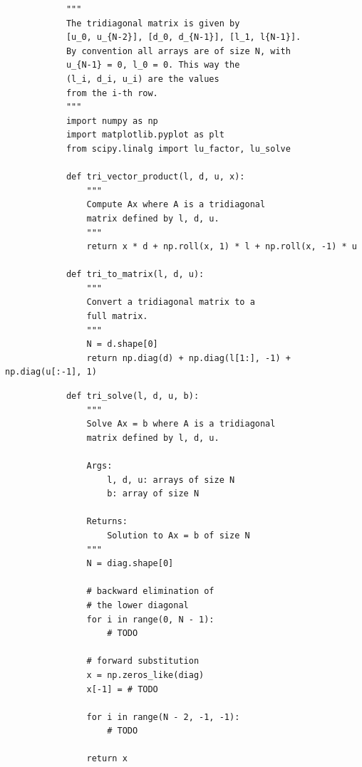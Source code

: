     \begin{codebox}
        \begin{verbatim}
            """
            The tridiagonal matrix is given by
            [u_0, u_{N-2}], [d_0, d_{N-1}], [l_1, l{N-1}].
            By convention all arrays are of size N, with
            u_{N-1} = 0, l_0 = 0. This way the
            (l_i, d_i, u_i) are the values 
            from the i-th row.
            """
            import numpy as np
            import matplotlib.pyplot as plt
            from scipy.linalg import lu_factor, lu_solve

            def tri_vector_product(l, d, u, x):
                """
                Compute Ax where A is a tridiagonal
                matrix defined by l, d, u.
                """
                return x * d + np.roll(x, 1) * l + np.roll(x, -1) * u

            def tri_to_matrix(l, d, u):
                """
                Convert a tridiagonal matrix to a
                full matrix.
                """
                N = d.shape[0]
                return np.diag(d) + np.diag(l[1:], -1) + np.diag(u[:-1], 1)
        \end{verbatim}
        \caption{Python code for a matrix-vector product $\mat{A}\vec{x}$ where $\mat{A}$ is tridiagonal
        and signature for a tridiagonal solve of $\mat{A}\vec{x} = \vec{b}$. Continued in Code-Snippet \ref{code:tridiag_task2}.}
        \label{code:tridiag_task1}
    \end{codebox}

    \begin{codebox}
        \begin{verbatim}
            def tri_solve(l, d, u, b):
                """
                Solve Ax = b where A is a tridiagonal
                matrix defined by l, d, u.

                Args:
                    l, d, u: arrays of size N
                    b: array of size N

                Returns:
                    Solution to Ax = b of size N
                """
                N = diag.shape[0]

                # backward elimination of 
                # the lower diagonal
                for i in range(0, N - 1):
                    # TODO

                # forward substitution
                x = np.zeros_like(diag)
                x[-1] = # TODO

                for i in range(N - 2, -1, -1):
                    # TODO
                
                return x
        \end{verbatim}
        \caption{Continuation of Code-Snippet \ref{code:tridiag_task1}. Continued in Code-Snippet \ref{code:tridiag_task3}}
        \label{code:tridiag_task2}
    \end{codebox}

